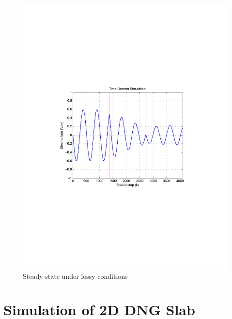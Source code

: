 \begin{figure}[H]
\centering
\includegraphics[scale=0.78, trim=3.5cm 8.7cm 4.5cm 8.75cm, clip]{Figures/FigCh03_1DDNGSteadyStateLossy.pdf}
\caption{Steady-state under lossy conditions}
\label{1DDNG-SteadyState-Lossy}
\end{figure}
\section{Simulation of 2D DNG Slab}
